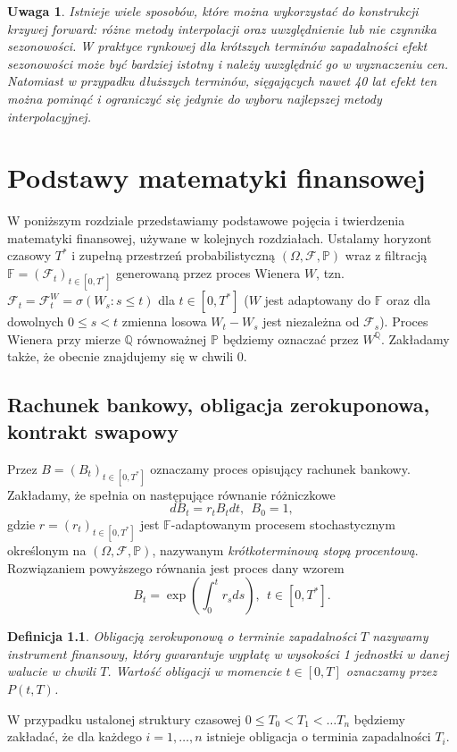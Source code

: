 \documentclass{mini}
\theoremstyle{mythstyle}
\newtheorem{Definicja}{Definicja}[chapter]
\newtheorem{Uwaga}{Uwaga}[chapter]
\begin{document}
	\begin{Uwaga}
		Istnieje wiele sposobów, które można wykorzystać do konstrukcji krzywej forward: różne metody interpolacji oraz uwzględnienie lub nie czynnika sezonowości. W praktyce rynkowej dla krótszych terminów zapadalności efekt sezonowości może być bardziej istotny i należy uwzględnić go w wyznaczeniu cen. Natomiast w przypadku dłuższych terminów, sięgających nawet 40 lat efekt ten można pominąć i ograniczyć się jedynie do wyboru najlepszej metody interpolacyjnej.
	\end{Uwaga}

\chapter{Podstawy matematyki finansowej}

	W poniższym rozdziale przedstawiamy podstawowe pojęcia i twierdzenia matematyki finansowej, używane w kolejnych rozdziałach. Ustalamy horyzont czasowy $T^*$ i zupełną przestrzeń probabilistyczną $(\Omega, \mathcal{F}, \mathbb{P})$ wraz z filtracją $\mathbb{F} = (\mathcal{F}_t)_{t\in [0,T^*]}$ generowaną przez proces Wienera $W$, tzn. $\mathcal{F}_t=\mathcal{F}_t^W=\sigma(W_s:s\leq t)$ dla $t \in [0,T^*]$ ($W$ jest adaptowany do $\mathbb{F}$ oraz dla dowolnych $0 \leq s < t $ zmienna losowa $W_t-W_s$ jest niezależna od $\mathcal{F}_s$). Proces Wienera przy mierze $\mathbb{Q}$ równoważnej $\mathbb{P}$ będziemy oznaczać przez $W^\mathbb{Q}$. Zakładamy także, że obecnie znajdujemy się w chwili 0.

\section{Rachunek bankowy, obligacja zerokuponowa, kontrakt swapowy}
	Przez $B=(B_t)_{t\in [0,T^*]}$ oznaczamy proces opisujący rachunek bankowy. Zakładamy, że spełnia on następujące równanie różniczkowe
	\[ dB_t = r_t B_t dt, \ \ B_0=1, \]
	gdzie $r=(r_t)_{t\in [0,T^*]}$ jest $\mathbb{F}$-adaptowanym procesem stochastycznym określonym na $(\Omega, \mathcal{F},\mathbb{P})$, nazywanym \textit{krótkoterminową stopą procentową}.
	Rozwiązaniem powyższego równania jest proces dany wzorem
	\[ B_t = \exp\left(\int_0^t r_s ds\right), \ \ t\in [0,T^*]. \]

\begin{Definicja}
	Obligacją zerokuponową o terminie zapadalności $T$ nazywamy instrument finansowy, który gwarantuje wypłatę w wysokości 1 jednostki w danej walucie w chwili $T$. Wartość obligacji w momencie $t\in [0,T]$ oznaczamy przez $P(t,T)$.
\end{Definicja}
	W przypadku ustalonej struktury czasowej $0 \leq T_0 < T_1 <\ldots T_n$ będziemy zakładać, że dla każdego $i=1,\ldots,n$ istnieje obligacja o terminia zapadalności $T_i$.
\end{document}
